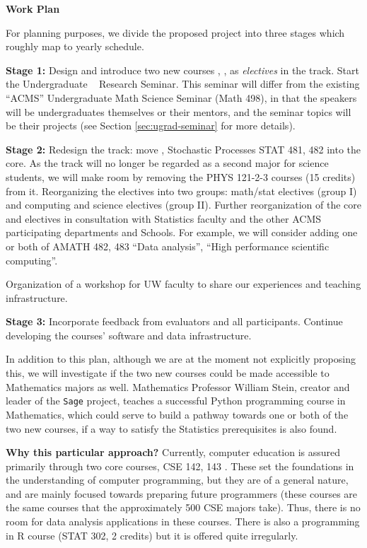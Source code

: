 {\bf Work Plan}

For planning purposes, we divide the proposed project into three stages which
roughly map to yearly schedule. 

{\bf Stage 1:} Design and introduce two new courses \statcl, \astrocl,
as {\em electives} in the track.  Start the Undergraduate \cdse~
Research Seminar. This seminar will differ from the existing ``ACMS''
Undergraduate Math Science Seminar ({\sc Math 498}), in that the
speakers will be undergraduates themselves or their mentors, and the
seminar topics will be their projects (see Section
\ref{sec:ugrad-seminar} for more details).

{\bf Stage 2:} Redesign the track: move \statcl, Stochastic Processes {\sc STAT 481, 482} into the core. As the track will no longer be regarded as a second major for science students, we will make room by removing the {\sc PHYS 121-2-3} courses (15 credits) from it.  Reorganizing the electives into two groups: math/stat electives (group I) and computing and science electives (group II). Further reorganization of the core and electives in consultation with Statistics faculty and the other ACMS participating departments and Schools. For example, we will consider adding one or both of {\sc AMATH 482, 483} ``Data analysis'', ``High performance scientific computing''.

Organization of a workshop for UW faculty to share our experiences and teaching infrastructure.

{\bf Stage 3:} Incorporate feedback from evaluators and all participants. Continue developing the courses' software and data infrastructure. 

In addition to this plan, although we are at the moment not explicitly
proposing this, we will investigate if the two new courses could be
made accessible to Mathematics majors as well. Mathematics Professor
William Stein, creator and leader of the {\tt Sage} project, teaches a
successful Python programming course in Mathematics, which could serve
to build a pathway towards one or both of the two new courses, if a
way to satisfy the Statistics prerequisites is also found.


{\bf Why this particular approach?} Currently, computer education is
assured primarily through two core courses, {\sc CSE 142, 143}
\cite{cse142}. These set the foundations in the understanding of
computer programming, but they are of a general nature, and are mainly
focused towards preparing future programmers  (these courses are the
same courses that the approximately 500 CSE majors take). Thus, there
is no room for data analysis applications in these courses.  There is
also a programming in R course ({\sc STAT 302}, 2 credits) but it is 
offered quite irregularly.

